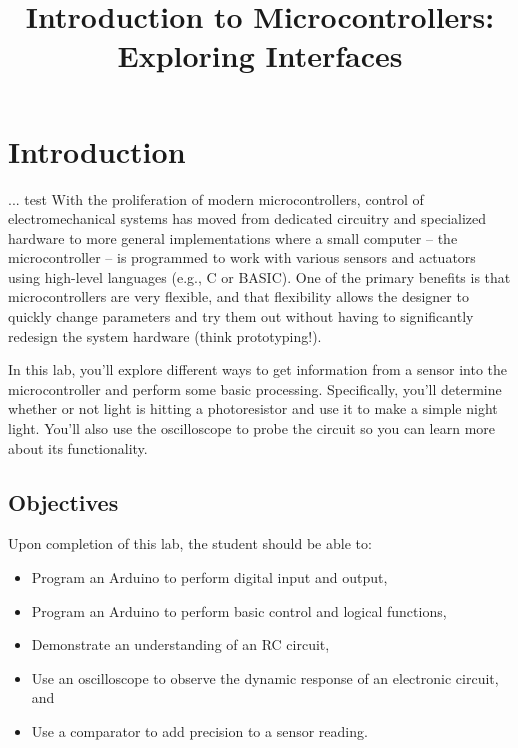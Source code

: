 \documentclass[11pt]{article} %
\title{Introduction to Microcontrollers: Exploring Interfaces}
\author{}
\date{} %
\begin{document}
\maketitle

\section*{Introduction}
...
test
With the proliferation of modern microcontrollers, control of electromechanical systems has moved from dedicated circuitry and specialized hardware to more general implementations where a small computer -- the microcontroller -- is programmed to work with various sensors and actuators using high-level languages (e.g., C or BASIC). One of the primary benefits is that microcontrollers are very flexible, and that flexibility allows the designer to quickly change parameters and try them out without having to significantly redesign the system hardware (think prototyping!).

In this lab, you’ll explore different ways to get information from a sensor into the microcontroller and perform some basic processing. Specifically, you’ll determine whether or not light is hitting a photoresistor and use it to make a simple night light. You’ll also use the oscilloscope to probe the circuit so you can learn more about its functionality.

\subsection*{Objectives}

Upon completion of this lab, the student should be able to:
\begin{itemize}
\item Program an Arduino to perform digital input and output,
\item Program an Arduino to perform basic control and logical functions,
\item Demonstrate an understanding of an RC circuit,
\item Use an oscilloscope to observe the dynamic response of an electronic circuit, and 
\item Use a comparator to add precision to a sensor reading.

\end{itemize}
\end{document}
